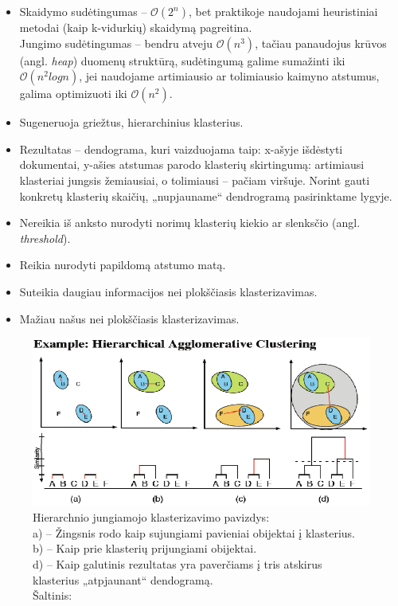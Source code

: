 \documentclass{VUMIFInfKursinis}
\newcommand{\ltang}[2]{#1 (angl. \textit{#2})}
\newcommand{\BigO}[1]{$\mathcal{O}(#1)$}
\begin{document}
\begin{itemize}
\item
  Skaidymo sudėtingumas – \BigO{2^n}, bet praktikoje naudojami
  heuristiniai metodai (kaip k-vidurkių) skaidymą pagreitina.\\
  Jungimo sudėtingumas – bendru atveju \BigO{n^3}, tačiau
  panaudojus \ltang{krūvos}{heap}   duomenų struktūrą, sudėtingumą
  galime sumažinti iki \BigO{n^2 log n}, jei naudojame artimiausio \cite{sibson1973slink}
  ar tolimiausio \cite{defays1977efficient} kaimyno atstumus, galima optimizuoti iki \BigO{n^2}.
\item
  Sugeneruoja griežtus, hierarchinius klasterius. 
\item
  Rezultatas – dendograma, kuri vaizduojama taip: x-ašyje išdėstyti
  dokumentai, y-ašies atstumas parodo klasterių skirtingumą: artimiausi
  klasteriai jungsis žemiausiai, o tolimiausi – pačiam viršuje. Norint
  gauti konkretų klasterių skaičių, „nupjauname“ dendrogramą
  pasirinktame lygyje.
\item
  Nereikia iš anksto nurodyti norimų klasterių kiekio ar 
 \ltang{slenksčio}{threshold}.
\item
  Reikia nurodyti papildomą atstumo matą.
\item
  Suteikia daugiau informacijos nei plokščiasis klasterizavimas.
\item
  Mažiau našus nei plokščiasis klasterizavimas.
\end{itemize}

\begin{figure}[H]
\centering
\includegraphics[scale=.5]{img/HierSteps}
\caption{Hierarchnio jungiamojo klasterizavimo pavizdys:\\
		 a) – Žingsnis rodo kaip sujungiami pavieniai obijektai į klasterius.\\
		 b) – Kaip prie klasterių prijungiami obijektai.\\
		 d) – Kaip galutinis rezultatas yra paverčiams į tris atskirus klasterius „atpjaunant“ dendogramą.\\
		 Šaltinis: \cite{janssen2012cluster}}
\end{figure}
\end{document}

